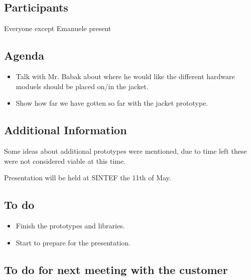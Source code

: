 \subsection{Participants}

Everyone except Emanuele present

\subsection{Agenda}

\begin{itemize}
\item Talk with Mr. Babak about where he would like the different hardware moduels should be placed on/in the jacket.
\item Show how far we have gotten so far with the jacket prototype.
\end{itemize}

\subsection{Additional Information}
Some ideas about additional prototypes were mentioned, due to time left these were not considered viable at this time.

Presentation will be held at SINTEF the 11th of May.

\subsection{To do}

\begin{itemize}
\item Finish the prototypes and libraries.
\item Start to prepare for the presentation.
\end{itemize}

\subsection{To do for next meeting with the customer}